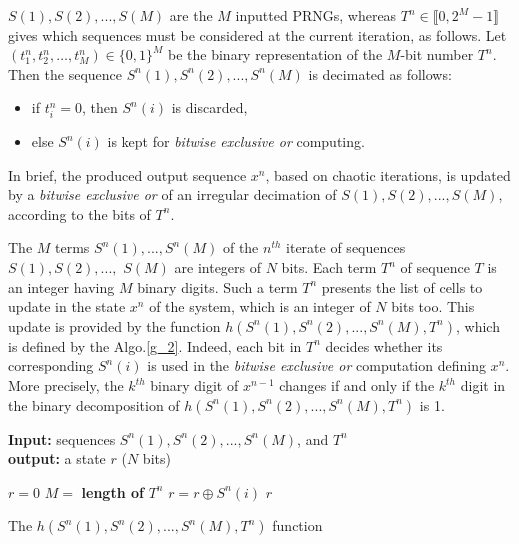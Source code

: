 $S(1), S(2), ..., S(M)$ are the $M$ inputted PRNGs, whereas $T^n\in\llbracket 0,2^M-1\rrbracket$ gives which sequences must be considered at the current
iteration, as follows.
Let $(t_1^n,t_2^n,\dots,t_M^n)\in \{0,1\}^M$ be the binary representation of the $M$-bit number $T^n$.
Then the sequence $S^n(1), S^n(2), ..., S^n(M)$ is decimated as follows:
\begin{itemize}
\item if $t^n_i = 0$, then $S^n(i)$ is discarded,
\item else $S^n(i)$ is kept for \emph{bitwise exclusive or} computing.
\end{itemize}
In brief, the produced output sequence $x^n$, based on chaotic iterations, is updated by a \emph{bitwise exclusive or} of an irregular decimation of $S(1), S(2), ..., S(M)$, according to the bits of $T^n$.


The $M$ terms $S^n(1),..., S^n(M)$ of 
the $n^{th}$ iterate of sequences $S(1), S(2), ...,$ $S(M)$
are integers of $N$ bits. 
Each term $T^n$ of sequence $T$ is an integer having 
$M$ binary digits. 
Such a term $T^n$ presents the list of cells 
to update in the state $x^n$ of the system, which is an integer of $N$ bits too. 
This update is provided by the function $h(S^n(1),S^n(2), ..., S^n(M),T^n)$, 
which is defined by the Algo.\ref{g_2}. 
Indeed, each bit in $T^n$ decides whether its 
corresponding $S^n(i)$ is used in the \emph{bitwise exclusive or} computation defining $x^n$. 
More precisely, 
the $k^{th}$ binary digit of $x^{n-1}$ changes if and only if 
the $k^{th}$ digit in the binary decomposition of 
$h(S^n(1),S^n(2), ..., S^n(M),T^n)$ is 1.



\begin{algorithm}
\textbf{Input:} sequences $S^n(1), S^n(2), ..., S^n(M)$, and $T^n$\\
\textbf{output:} a state $r$ ($N$ bits)\\
\begin{algorithmic}[1]
\STATE$r = 0 $\;
\STATE$M =$ \textbf{length of} $T^n$ \;
\;
{
\STATE $r = r \oplus S^n(i)$\;
}\ENDIF
\ENDFOR
\RETURN $r$\;
\medskip
\caption{The $h(S^n(1),S^n(2),...,S^n(M),T^n)$ function}
\label{g_2}
\end{algorithmic}
\end{algorithm}

